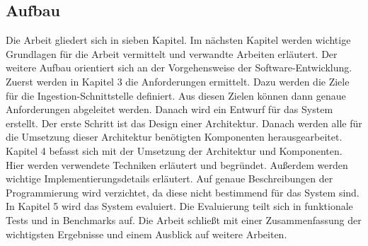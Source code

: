 \subsection{Aufbau}
Die Arbeit gliedert sich in sieben Kapitel.
Im nächsten Kapitel werden wichtige Grundlagen für die Arbeit vermittelt und verwandte Arbeiten erläutert.
Der weitere Aufbau orientiert sich an der Vorgehensweise der Software-Entwicklung.
Zuerst werden in Kapitel 3 die Anforderungen ermittelt.
Dazu werden die Ziele für die Ingestion-Schnittstelle definiert.
Aus diesen Zielen können dann genaue Anforderungen abgeleitet werden.
Danach wird ein Entwurf für das System erstellt.
Der erste Schritt ist das Design einer Architektur.
Danach werden alle für die Umsetzung dieser Architektur benötigten Komponenten herausgearbeitet.
Kapitel 4 befasst sich mit der Umsetzung der Architektur und Komponenten.
Hier werden verwendete Techniken erläutert und begründet.
Außerdem werden wichtige Implementierungsdetails erläutert.
Auf genaue Beschreibungen der Programmierung wird verzichtet, da diese nicht bestimmend für das System sind.
In Kapitel 5 wird das System evaluiert.
Die Evaluierung teilt sich in funktionale Tests und in Benchmarks auf.
Die Arbeit schließt mit einer Zusammenfassung der wichtigsten Ergebnisse und einem Ausblick auf weitere Arbeiten.